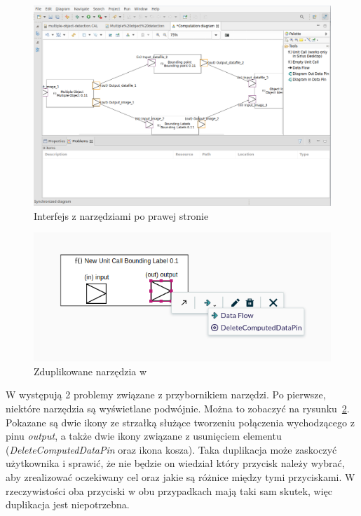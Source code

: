 \begin{figure}[t]
  \centering

  \includegraphics[width=0.90\linewidth]{./images/sirius-desktop-model-editor.png}
  \caption{Interfejs \SiriusDesktop{} z narzędziami po prawej
    stronie}\label{rys:sirius-desktop-model-editor-tools-right}
\end{figure}

\begin{figure}[b]
  \centering

  \includegraphics[width=0.70\linewidth]{./images/sirius-web-duplicate-tools.png}
  \caption{Zduplikowane narzędzia w \SiriusWeb{}}\label{rys:sirius-web-duplicate-tools}
\end{figure}

W \SiriusWeb{} występują 2 problemy związane z przybornikiem narzędzi. Po
pierwsze, niektóre narzędzia są wyświetlane podwójnie. Można to zobaczyć na
rysunku~\ref{rys:sirius-web-duplicate-tools}. Pokazane są dwie ikony ze
strzałką służące tworzeniu połączenia wychodzącego z pinu \emph{output}, a
także dwie ikony związane z usunięciem elementu (\emph{DeleteComputedDataPin}
oraz ikona kosza). Taka duplikacja może zaskoczyć użytkownika i sprawić, że nie
będzie on wiedział który przycisk należy wybrać, aby zrealizować oczekiwany cel
oraz jakie są różnice między tymi przyciskami. W rzeczywistości oba przyciski w
obu przypadkach mają taki sam skutek, więc duplikacja jest niepotrzebna.

